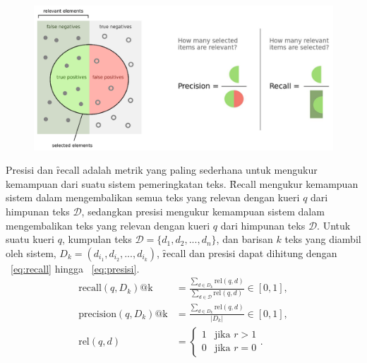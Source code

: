         \begin{figure}
            \centering
            \includegraphics[width=1\textwidth]{assets/pics/recall-presisi.png}
            \label{fig:recall-precision}
        \end{figure}
        Presisi dan \f{recall} adalah metrik yang paling sederhana untuk mengukur kemampuan dari suatu sistem pemeringkatan teks. \f{Recall} mengukur kemampuan sistem dalam mengembalikan semua teks yang relevan dengan kueri $q$ dari himpunan teks $\mathcal{D}$, sedangkan presisi mengukur kemampuan sistem dalam mengembalikan teks yang relevan dengan kueri $q$ dari himpunan teks $\mathcal{D}$. Untuk suatu kueri $q$, kumpulan teks $\mathcal{D} = \{d_1, d_2, ..., d_n\}$, dan barisan $k$ teks yang diambil oleh sistem, $D_k = (d_{i_1}, d_{i_2}, ..., d_{i_k})$, \f{recall} dan presisi dapat dihitung dengan \equ~\ref{eq:recall} hingga \equ~\ref{eq:presisi}.
        \begin{align}
            \label{eq:recall}
            \text{recall}(q, D_k)\text{@k} &= \frac{\sum_{d \in D_k} \text{rel}(q, d)}{\sum_{d \in \mathcal{D}} \text{rel}(q, d)} \in [0, 1], \\
            \label{eq:presisi}
            \text{precision}(q, D_k)\text{@k} &= \frac{\sum_{d \in D_k} \text{rel}(q, d)}{|D_k|} \in [0, 1], \\
            \label{eq:rel}
            \text{rel}(q, d) &= \begin{cases} 
            1 & \text{jika } r > 1 \\
            0 & \text{jika } r = 0
            \end{cases}.
        \end{align}


